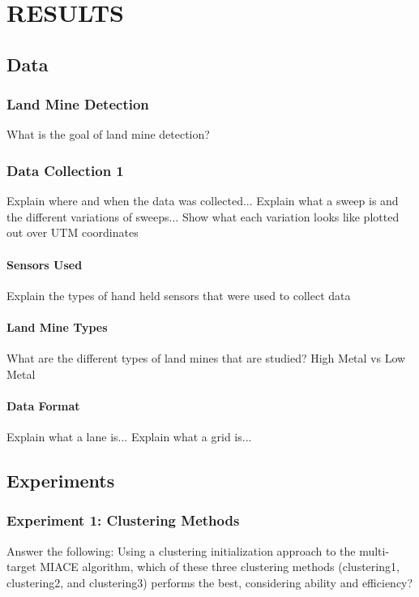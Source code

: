 \chapter{RESULTS} \label{results}

\section{Data}

\subsection{Land Mine Detection}
What is the goal of land mine detection?

\subsection{Data Collection 1}
Explain where and when the data was collected...\newline
Explain what a sweep is and the different variations of sweeps...\newline
Show what each variation looks like plotted out over UTM coordinates

\subsubsection{Sensors Used}
Explain the types of hand held sensors that were used to collect data

\subsubsection{Land Mine Types}
What are the different types of land mines that are studied?\newline
High Metal vs Low Metal

\subsubsection{Data Format}
Explain what a lane is...\newline
Explain what a grid is...




\section{Experiments}

\subsection{Experiment 1: Clustering Methods}
Answer the following: Using a clustering initialization approach to the multi-target MIACE algorithm, which of these three clustering methods (clustering1, clustering2, and clustering3) performs the best, considering ability and efficiency?

